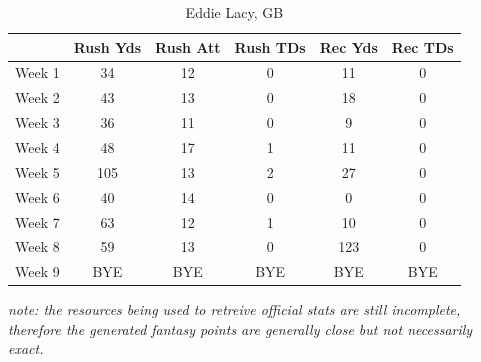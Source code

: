 \documentclass{article}
\begin{document}
    \begin{table}[h,t]
        \caption{ Eddie Lacy, GB }
        \begin{tabular}{ l|ccccc }
            \hline
 & Rush Yds & Rush Att & Rush TDs & Rec Yds & Rec TDs\\
            \hline \hline
Week 1 & 34 & 12 & 0 & 11 & 0\\
Week 2 & 43 & 13 & 0 & 18 & 0\\
Week 3 & 36 & 11 & 0 & 9 & 0\\
Week 4 & 48 & 17 & 1 & 11 & 0\\
Week 5 & 105 & 13 & 2 & 27 & 0\\
Week 6 & 40 & 14 & 0 & 0 & 0\\
Week 7 & 63 & 12 & 1 & 10 & 0\\
Week 8 & 59 & 13 & 0 & 123 & 0\\
Week 9 & BYE & BYE & BYE & BYE & BYE\\
        \end{tabular}
    \end{table}

    \textit{note: the resources being used to retreive official stats are still incomplete, therefore the generated fantasy points are generally close but not necessarily exact.}
\end{document}
